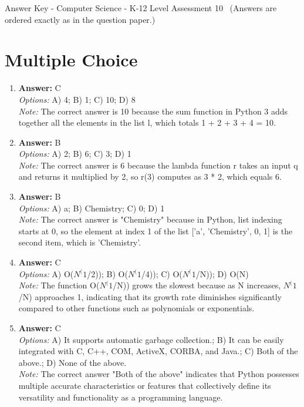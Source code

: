 \documentclass[12pt]{article}
\begin{document}
\begin{center}
Answer Key - Computer Science - K-12 Level Assessment 10 \
\small (Answers are ordered exactly as in the question paper.)
\end{center}

\section*{Multiple Choice}
\begin{enumerate}[label=\arabic*.]
\item \textbf{Answer:} C
\\ \textit{Options:} A) 4; B) 1; C) 10; D) 8
\\ \textit{Note:} The correct answer is 10 because the sum function in Python 3 adds together all the elements in the list l, which totals 1 + 2 + 3 + 4 = 10.
\item \textbf{Answer:} B
\\ \textit{Options:} A) 2; B) 6; C) 3; D) 1
\\ \textit{Note:} The correct answer is 6 because the lambda function r takes an input q and returns it multiplied by 2, so r(3) computes as 3 * 2, which equals 6.
\item \textbf{Answer:} B
\\ \textit{Options:} A) a; B) Chemistry; C) 0; D) 1
\\ \textit{Note:} The correct answer is "Chemistry" because in Python, list indexing starts at 0, so the element at index 1 of the list ['a', 'Chemistry', 0, 1] is the second item, which is 'Chemistry'.
\item \textbf{Answer:} C
\\ \textit{Options:} A) O($N^(1$/2)); B) O($N^(1$/4)); C) O($N^(1$/N)); D) O(N)
\\ \textit{Note:} The function O($N^(1$/N)) grows the slowest because as N increases, $N^(1$/N) approaches 1, indicating that its growth rate diminishes significantly compared to other functions such as polynomials or exponentials.
\item \textbf{Answer:} C
\\ \textit{Options:} A) It supports automatic garbage collection.; B) It can be easily integrated with C, C++, COM, ActiveX, CORBA, and Java.; C) Both of the above.; D) None of the above.
\\ \textit{Note:} The correct answer "Both of the above" indicates that Python possesses multiple accurate characteristics or features that collectively define its versatility and functionality as a programming language.
\end{enumerate}
\end{document}
